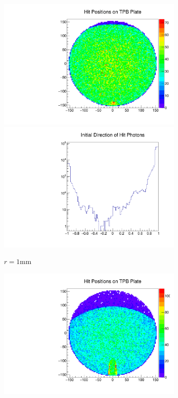 \documentclass[aps,pra,notitlepage,groupedaddress]{revtex4-1}
\begin{document}
\begin{figure}
\begin{center}
\begin{subfigure}{0.32\textwidth}
\begin{minipage}{1.0\textwidth}
			\includegraphics[width=1.0\textwidth]{figures/hit_100.pdf}
			\includegraphics[width=1.0\textwidth]{figures/init_100.pdf}
		\end{minipage}
		\caption{$r=1$mm}
	\end{subfigure}
	\begin{subfigure}{0.32\textwidth}
		\begin{minipage}{1.0\textwidth}
			\includegraphics[width=1.0\textwidth]{figures/hit_150.pdf}

\end{minipage}
\end{subfigure}
\end{center}
\end{figure}
\end{document}
